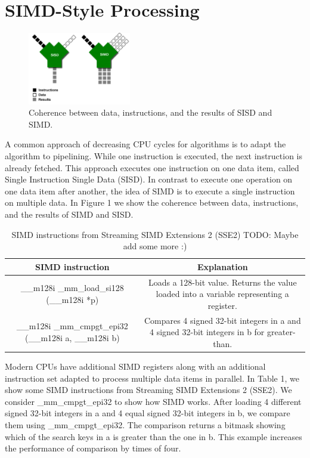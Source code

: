 \documentclass[conference]{IEEEtran}
\begin{document}
\section{SIMD-Style Processing}
\begin{figure}
	\includegraphics[width=0.4\textwidth]{figure_1.png}
	\caption{Coherence between data, instructions, and the results of SISD and SIMD.}
	\label{fig}
\end{figure}
A common approach of decreasing CPU cycles for algorithms is to adapt the algorithm to pipelining. While one instruction is executed, the next instruction is already fetched. This approach executes one instruction on one data item, called Single Instruction Single Data (SISD). In contrast to execute one operation on one data item after another, the idea of SIMD is to execute a single instruction on multiple data. In Figure 1 we show the coherence between data, instructions, and the results of SIMD and SISD. 
\begin{table}[htbp]
	\caption{SIMD instructions from Streaming SIMD Extensions 2 (SSE2) TODO: Maybe add some more :)}
	\begin{center}
		\begin{tabular}{|c|c|}
			\hline
			\textbf{SIMD instruction}&\textbf{Explanation}\\
			\hline
			\_\_m128i \_mm\_load\_si128 (\_\_m128i *p) & Loads a 128-bit value. Returns the value loaded into a variable representing a register.\\
			\_\_m128i \_mm\_cmpgt\_epi32 (\_\_m128i a, \_\_m128i b) & Compares 4 signed 32-bit integers in a and 4 signed 32-bit integers
			in b for greater-than.\\
			\hline
		\end{tabular}
		\label{tab1}
	\end{center}
\end{table}
Modern CPUs have additional SIMD registers along with an additional instruction set adapted to process multiple data items in parallel. In Table 1, we show some SIMD instructions from Streaming SIMD Extensions 2 (SSE2). We consider \_mm\_cmpgt\_epi32 to show how SIMD works. After loading 4 different signed 32-bit integers in a and 4 equal signed 32-bit integers in b, we compare them using \_mm\_cmpgt\_epi32. The comparison returns a bitmask showing which of the search keys in a is greater than the one in b. This example increases the performance of comparison by times of four. 
\end{document}
